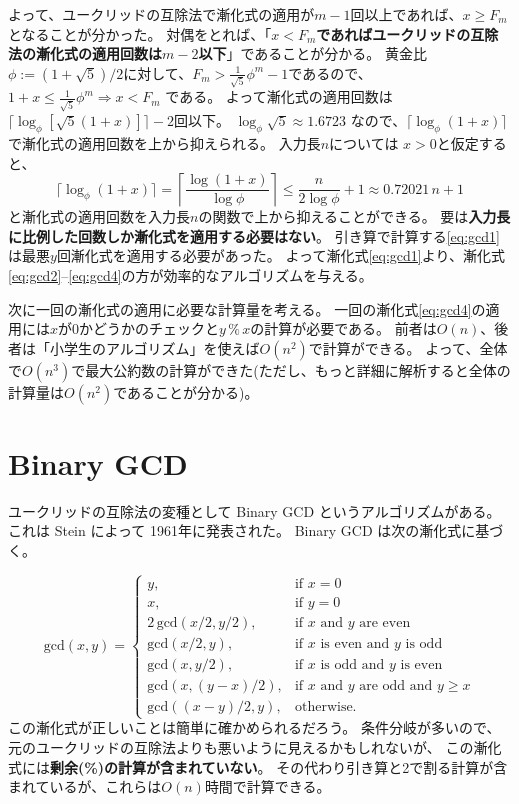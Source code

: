 \documentclass[a4paper,twoside,onecolumn,openany,article,10pt]{memoir}
\theoremstyle{remark}
\begin{document}
よって、ユークリッドの互除法で漸化式の適用が$m-1$回以上であれば、$x\ge F_{m}$となることが分かった。
対偶をとれば、「\textbf{$x <F_{m}$であればユークリッドの互除法の漸化式の適用回数は$m-2$以下}」であることが分かる。
黄金比$\phi:=(1+\sqrt{5})/2$に対して、$F_m> \frac1{\sqrt{5}}\phi^m-1$であるので、$1+x \le \frac1{\sqrt{5}}\phi^{m} \Rightarrow x< F_{m}$ である。
よって漸化式の適用回数は $\lceil\log_\phi[\sqrt{5}(1+x)]\rceil-2$回以下。
$\log_\phi \sqrt{5} \approx 1.6723$ なので、$\lceil\log_\phi (1+x)\rceil$ で漸化式の適用回数を上から抑えられる。
入力長$n$については $x > 0$と仮定すると、
\begin{equation*}
\lceil\log_\phi (1+x)\rceil
=
\left\lceil\frac{\log (1+x)}{\log \phi}\right\rceil
\le
\frac{n}{2\log \phi}+1
\approx 0.72021\, n + 1
\end{equation*}
と漸化式の適用回数を入力長$n$の関数で上から抑えることができる。
要は\textbf{入力長に比例した回数しか漸化式を適用する必要はない}。
引き算で計算する\eqref{eq:gcd1}は最悪$y$回漸化式を適用する必要があった。
よって漸化式\eqref{eq:gcd1}より、漸化式\eqref{eq:gcd2}--\eqref{eq:gcd4}の方が効率的なアルゴリズムを与える。

次に一回の漸化式の適用に必要な計算量を考える。
一回の漸化式\eqref{eq:gcd4}の適用には$x$が0かどうかのチェックと$y\,\%\,x$の計算が必要である。
前者は$O(n)$、後者は「小学生のアルゴリズム」を使えば$O(n^2)$で計算ができる。
よって、全体で$O(n^3)$で最大公約数の計算ができた(ただし、もっと詳細に解析すると全体の計算量は$O(n^2)$であることが分かる)。

\section{Binary GCD}
ユークリッドの互除法の変種として Binary GCD というアルゴリズムがある。
これは Stein によって 1961年に発表された。
Binary GCD は次の漸化式に基づく。

\begin{equation}
\mathrm{gcd}(x, y) =
\begin{cases}
y,& \text{if } x = 0\\
x,& \text{if } y = 0\\
2\,\mathrm{gcd}(x/2, y/2),& \text{if $x$ and $y$ are even}\\
\mathrm{gcd}(x/2, y),& \text{if $x$ is even and $y$ is odd}\\
\mathrm{gcd}(x, y/2),& \text{if $x$ is odd and $y$ is even}\\
\mathrm{gcd}(x, (y-x)/2),& \text{if $x$ and $y$ are odd and $y \ge x$}\\
\mathrm{gcd}((x-y)/2, y),& \text{otherwise.}
\end{cases}
\label{eq:bgcd}
\end{equation}
この漸化式が正しいことは簡単に確かめられるだろう。
条件分岐が多いので、元のユークリッドの互除法よりも悪いように見えるかもしれないが、
この漸化式には\textbf{剰余(\%)の計算が含まれていない}。
その代わり引き算と2で割る計算が含まれているが、これらは$O(n)$時間で計算できる。
\end{document}

